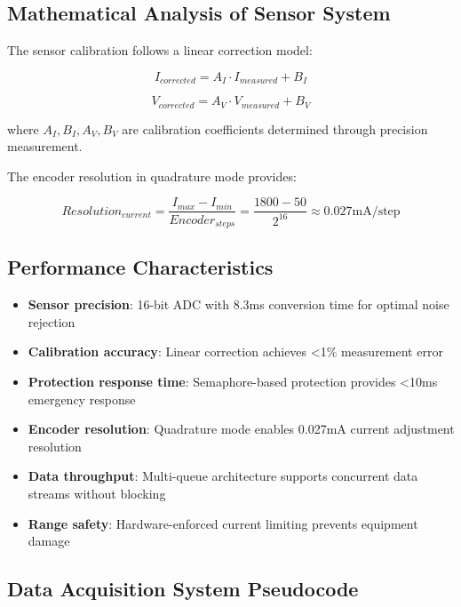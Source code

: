 \documentclass{article}
\begin{document}
\subsection{Mathematical Analysis of Sensor System}

The sensor calibration follows a linear correction model:

\begin{equation}
I_{corrected} = A_I \cdot I_{measured} + B_I
\end{equation}

\begin{equation}
V_{corrected} = A_V \cdot V_{measured} + B_V
\end{equation}

where $A_I, B_I, A_V, B_V$ are calibration coefficients determined through precision measurement.

The encoder resolution in quadrature mode provides:

\begin{equation}
Resolution_{current} = \frac{I_{max} - I_{min}}{Encoder_{steps}} = \frac{1800 - 50}{2^{16}} \approx 0.027 \text{mA/step}
\end{equation}

\subsection{Performance Characteristics}

\begin{itemize}
    \item \textbf{Sensor precision}: 16-bit ADC with 8.3ms conversion time for optimal noise rejection
    \item \textbf{Calibration accuracy}: Linear correction achieves <1\% measurement error
    \item \textbf{Protection response time}: Semaphore-based protection provides <10ms emergency response
    \item \textbf{Encoder resolution}: Quadrature mode enables 0.027mA current adjustment resolution
    \item \textbf{Data throughput}: Multi-queue architecture supports concurrent data streams without blocking
    \item \textbf{Range safety}: Hardware-enforced current limiting prevents equipment damage
\end{itemize}

\subsection{Data Acquisition System Pseudocode}
\end{document}
